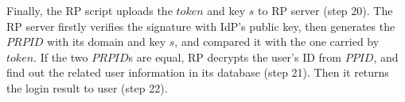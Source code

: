 Finally, the RP script uploads the $token$ and key $s$ to RP server (step 20). The RP server firstly verifies the signature with IdP's public key, then generates the $PRPID$ with its domain and key $s$, and compared it with the one carried by $token$. If the two $PRPID$s are equal, RP decrypts the user's ID from $PPID$, and find out the related user information in its database (step 21). Then it returns the login result to user (step 22). 